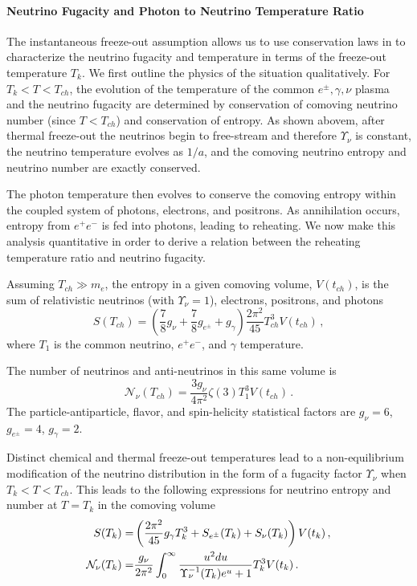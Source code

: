 \paragraph{Neutrino Fugacity and Photon to Neutrino Temperature Ratio}%
The instantaneous freeze-out assumption allows us to use conservation laws in  to characterize the neutrino fugacity and temperature in terms of the freeze-out temperature $T_k$.  We first outline the physics of the situation qualitatively. For $T_k<T<T_{ch}$, the evolution of the temperature of the common $e^\pm,\gamma,\nu$ plasma and the neutrino fugacity are determined by conservation of comoving neutrino number (since $T<T_{ch}$) and conservation of entropy.    As shown abovem, after thermal freeze-out the neutrinos begin to free-stream and therefore $\Upsilon_\nu$ is constant, the neutrino temperature evolves as $1/a$, and the comoving neutrino entropy and neutrino number are exactly conserved.  

The photon temperature then evolves to conserve the comoving entropy within the coupled system of photons, electrons, and positrons.  As annihilation occurs, entropy from $e^+e^-$ is fed into photons, leading to reheating.  We now make this analysis quantitative in order to derive a relation between the reheating temperature ratio and neutrino fugacity.

Assuming $T_{ch}\gg m_e$, the entropy in a given comoving volume, $V(t_{ch})$, is the sum of relativistic neutrinos (with $\Upsilon_\nu=1$), electrons, positrons, and photons
\begin{equation}
S(T_{ch})=\left(\frac{7}{8}g_\nu+\frac{7}{8}g_{e^\pm} +g_\gamma \right)\frac{2\pi^2}{45} T_{ch}^3V(t_{ch})\,,
\end{equation}
where $T_1$ is the common neutrino, $e^+e^-$, and $\gamma$ temperature. 

The number of neutrinos and anti-neutrinos in this same volume is
\begin{equation}
\mathcal{N}_\nu(T_{ch})=\frac{3g_\nu}{4\pi^2}\zeta(3)T_1^3V(t_{ch})\,.
\end{equation}
The particle-antiparticle, flavor, and spin-helicity statistical factors are $g_\nu=6$, $g_{e^\pm}=4$, $g_\gamma=2$.

Distinct chemical and thermal freeze-out temperatures lead to a non-equilibrium modification of the neutrino distribution in the form of a fugacity factor $\Upsilon_\nu$ when $T_k<T<T_{ch}$.  This leads to the following expressions for neutrino entropy and number at $T=T_k$ in the comoving volume
\begin{align}
S(T_k)=&\left(\frac{2\pi^2}{45}g_\gamma T_k^3+S_{e^\pm}(T_k)+S_{\nu}(T_k)\right)V(t_k)\,,\\
\mathcal{N}_{\nu}(T_k)=&\frac{g_\nu}{2\pi^2}\int_0^\infty \frac{u^2 du}{\Upsilon_\nu^{-1}(T_k)e^u+1}T_k^3V(t_k)\,.\notag
\end{align}


